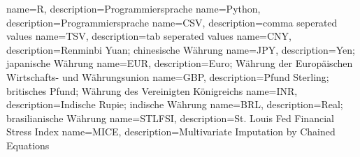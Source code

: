 {
    name=R,
    description={Programmiersprache}
}
{
    name=Python,
    description={Programmiersprache}
}
{
    name=CSV,
    description={comma seperated values}
}
{
    name=TSV,
    description={tab seperated values}
}
{
    name=CNY,
    description={Renminbi Yuan; chinesische Währung}
}
{
    name=JPY,
    description={Yen; japanische Währung}
}
{
    name=EUR,
    description={Euro; Währung der Europäischen Wirtschafts- und Währungsunion}
}
{
    name=GBP,
    description={Pfund Sterling; britisches Pfund; Währung des Vereinigten Königreichs}
}
{
    name=INR,
    description={Indische Rupie; indische Währung}
}
{
    name=BRL,
    description={Real; brasilianische Währung}
}
{
    name=STLFSI,
    description={St. Louis Fed Financial Stress Index}
}
{
    name=MICE,
    description={Multivariate Imputation by Chained Equations}
}
